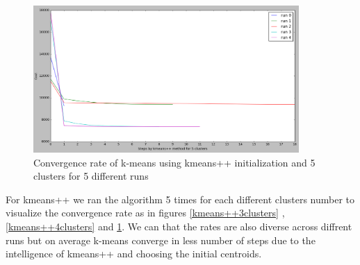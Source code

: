 \begin{figure}[!htb]
\centering
\includegraphics[width=0.9\textwidth]{shots/kmeans++5clusters.png}
\caption{ Convergence rate of k-means using kmeans++ initialization and 5 clusters for 5 different runs }
\label{kmeans++5clusters}
\end{figure}
  

For kmeans++ we ran the algorithm 5 times for each different clusters number to visualize the convergence rate as in figures \ref{kmeans++3clusters} , \ref{kmeans++4clusters} and \ref{kmeans++5clusters}. We can that the rates are also diverse across diffrent runs but on average k-means converge in less number of steps due to the intelligence of kmeans++ and choosing the initial centroids. 















